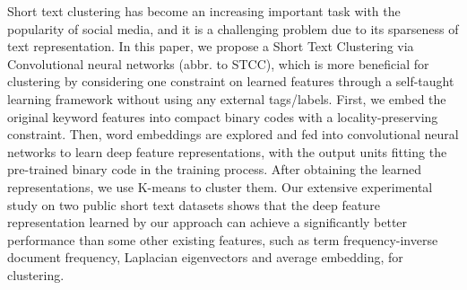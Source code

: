 Short text clustering has become an increasing important task with the popularity of social media, and it is a challenging problem due to its sparseness of text representation. In this paper, we propose a Short Text Clustering via Convolutional neural networks (abbr. to STCC), which is more beneficial for clustering by considering one constraint on learned features through a self-taught learning framework without using any external tags/labels. First, we embed the original keyword features into compact binary codes with a locality-preserving constraint. Then, word embeddings are explored and fed into convolutional neural networks to learn deep feature representations, with the output units fitting the pre-trained binary code in the training process. After obtaining the learned representations, we use K-means to cluster them. Our extensive experimental study on two public short text datasets shows that the deep feature representation learned by our approach can achieve a significantly better performance than some other existing features, such as term frequency-inverse document frequency, Laplacian eigenvectors and average embedding, for clustering.
